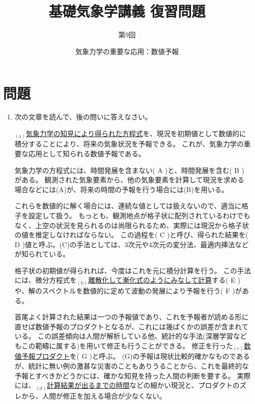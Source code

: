 \documentclass{jsarticle}
\newenvironment{problems}
{
  \renewcommand\labelenumi{\doublebox{\arabic{enumi}}}
  \begin{enumerate}
}{
  \end{enumerate}
  \renewcommand\labelenumi{\arabic{enumi}.}
}
\begin{document}
\title{基礎気象学講義 復習問題} %
\author{第9回} %
\date{気象力学の重要な応用：数値予報} %
\maketitle

\section{問題}

    \begin{problems}
    \item 次の文章を読んで、後の問いに答えなさい。
        \begin{screen}
        $_{(\mathrm{a})}$\underline{気象力学の知見により得られた方程式}を、現況を初期値として数値的に積分することにより、将来の気象状況を予報できる。
        これが、気象力学の重要な応用として知られる数値予報である。

        気象力学の方程式には、時間発展を含まない( A )と、時間発展を含む( B )がある。
        観測された気象要素から、他の気象要素を計算して現況を求める場合などには(A)が、将来の時間の予報を行う場合には(B)を用いる。

        これらを数値的に解く場合には、連続な値としては扱えないので、適当に格子を設定して扱う。
        もっとも、観測地点が格子状に配列されているわけでもなく、上空の状況を見られるのは尚限られるため、実際には現況から格子状の値を推定しなければならない。
        この過程を( C )と呼び、得られた結果を( D )値と呼ぶ。(C)の手法としては、3次元や4次元の変分法、最適内挿法などが知られている。

        格子状の初期値が得られれば、今度はこれを元に積分計算を行う。
        この手法には、微分方程式を$_{(\mathrm{b})}$\underline{離散化して漸化式のようにみなして計算}する( E )や、解のスペクトルを数値的に定めて波動の発展により予報を行う( F )がある。

        首尾よく計算された結果は一つの予報値であり、これを予報者が読める形に直せば数値予報のプロダクトとなるが、これには幾ばくかの誤差が含まれている。
        この誤差傾向は人間が解析している他、統計的な手法(深層学習などもこの範疇に属する)を用いて修正も行うことができる。
        修正を行った$_{(\mathrm{c})}$\underline{数値予報プロダクト}を( G )と呼ぶ。
        (G)の予報は現状比較的確かなものであるが、統計に無い例の激甚な災害のこともありうることから、これを最終的な予報とすべきかどうかには、確かな知見を持った人間の判断を要する。
        実際には、$_{(\mathrm{d})}$\underline{計算結果が出るまでの時間}などの細かい現況と、プロダクトのズレから、人間が修正を加える場合が少なくない。


\end{screen}
\end{problems}
\end{document}
